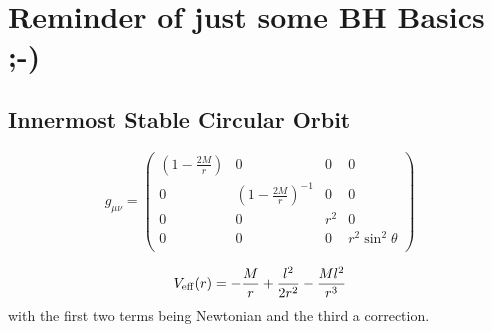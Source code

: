 \documentclass[11pt,a4paper]{article}
\begin{document}
\iffalse
\newpage
\section{Reminder of just some BH Basics ;-)} 

\subsection{Innermost Stable Circular Orbit}
\begin{equation}
g_{\mu \nu} = 
\begin{pmatrix}
(1- \frac{2M}{r})   & 0                                  & 0         & 0  \\ 
0                          & (1- \frac{2M}{r})^{-1}    & 0         & 0 \\ 
0                          & 0                                  & r^{2}   & 0 \\ 
0                          & 0                                  & 0         & r^2 \sin^2\theta\\
\end{pmatrix}
\end{equation}

\begin{equation}
V_{\rm eff}(r) = - \frac{M}{r}  + \frac{l^2}{2r^2} - \frac{Ml^2}{r^3}
\end{equation}
with the first two terms being Newtonian and the third a correction. 
\end{document}
